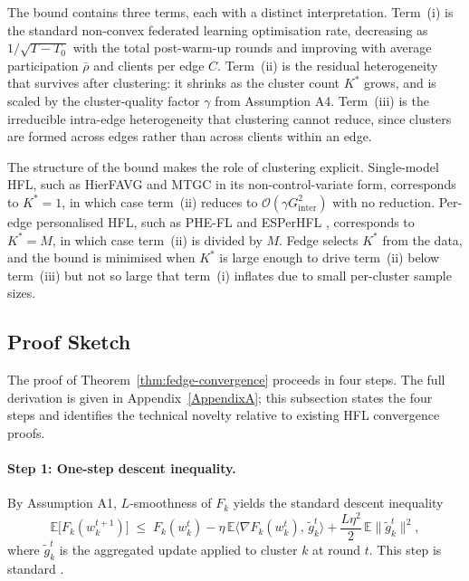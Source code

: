 The bound contains three terms, each with a distinct interpretation. Term~(i) is the standard non-convex federated learning optimisation rate, decreasing as $1/\sqrt{T - T_{0}}$ with the total post-warm-up rounds and improving with average participation $\bar{\rho}$ and clients per edge $C$. Term~(ii) is the residual heterogeneity that survives after clustering: it shrinks as the cluster count $K^{*}$ grows, and is scaled by the cluster-quality factor $\gamma$ from Assumption A4. Term~(iii) is the irreducible intra-edge heterogeneity that clustering cannot reduce, since clusters are formed across edges rather than across clients within an edge.

The structure of the bound makes the role of clustering explicit. Single-model HFL, such as HierFAVG \cite{liu2020hierfavg} and MTGC \cite{fang2024hierarchical} in its non-control-variate form, corresponds to $K^{*} = 1$, in which case term~(ii) reduces to $\mathcal{O}(\gamma G_{\text{inter}}^{2})$ with no reduction. Per-edge personalised HFL, such as PHE-FL \cite{lee2025phefl} and ESPerHFL \cite{ma2024personalized}, corresponds to $K^{*} = M$, in which case term~(ii) is divided by $M$. Fedge selects $K^{*}$ from the data, and the bound is minimised when $K^{*}$ is large enough to drive term~(ii) below term~(iii) but not so large that term~(i) inflates due to small per-cluster sample sizes.

\subsection{Proof Sketch}
\label{subsec:fedge-proof-sketch}

The proof of Theorem~\ref{thm:fedge-convergence} proceeds in four steps. The full derivation is given in Appendix~\ref{AppendixA}; this subsection states the four steps and identifies the technical novelty relative to existing HFL convergence proofs.

\paragraph{Step 1: One-step descent inequality.}
By Assumption A1, $L$-smoothness of $F_{k}$ yields the standard descent inequality
\begin{equation}
\label{eq:proof-step1}
\mathbb{E} \big[ F_{k}(w_{k}^{t+1}) \big] \;\leq\; F_{k}(w_{k}^{t}) - \eta \, \mathbb{E} \big\langle \nabla F_{k}(w_{k}^{t}), \, \tilde{g}_{k}^{t} \big\rangle + \frac{L \eta^{2}}{2} \, \mathbb{E} \big\| \tilde{g}_{k}^{t} \big\|^{2},
\end{equation}
where $\tilde{g}_{k}^{t}$ is the aggregated update applied to cluster $k$ at round $t$. This step is standard \cite{karimireddy2020scaffold}.

